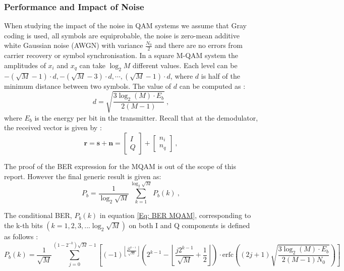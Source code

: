 \documentclass[12pt,a4paper,openright]{report}
\begin{document}
\subsubsection{Performance and Impact of Noise}
\label{sec:MQAMperf}
When studying the impact of the noise in QAM systems we assume that Gray coding is used, all symbols are equiprobable, the noise is zero-mean additive white Gaussian noise (AWGN) with variance $\frac{N_0}{2}$ and there are no errors from carrier recovery or symbol synchronisation. In a square M-QAM system the amplitudes of $x_i$ and $x_q$ can take $\log_2{M}$ different values. Each level can be 
$ -(\sqrt M  -1)\cdot d, - (\sqrt M  - 3)\cdot d,\cdots,(\sqrt M  - 1)\cdot d $, where $d$ is half of the minimum distance between two symbols. The value of $d$ can be computed as \cite{BER-QAM paper}: 
\begin{equation}\label{Eq: MQAM min dist}
d = \sqrt {\frac{{3{{\log }_2}(M) \cdot {E_b}}}{{2(M - 1)}}}\ ,
\end{equation}
where $E_b$ is the energy per bit in the transmitter. Recall that at the demodulator, the received vector is given by \cite{BER-QAM paper}: 
\begin{equation}
 \mathbf{r}=\mathbf{s}+\mathbf{n}=\left[ \begin{array}{l}I\\Q \end{array} \right] + \left[ \begin{array}{l}{n_i}\\{n_q}\end{array} \right]\ ,
\end{equation}


The proof of the BER expression for the MQAM is out of the scope of this report. However the final generic result is given as: 
\begin{equation}\label{Eq: BER MQAM}
{P_b} = \frac{1}{{{{\log }_2}\sqrt M }}\sum\limits_{k = 1}^{{{\log }_2}\sqrt M } {{P_b}(k)}\ ,
\end{equation}


The conditional BER,  $P_b(k)$ in equation \ref{Eq: BER MQAM}, corresponding to the k-th bits $(k=1,2,3,... \log_2{\sqrt{M}} )$ on both I and Q components is defined as follows \cite{BER-QAM paper}:
\begin{equation} \label{eq:mqamBER}
{P_b}(k) = \frac{1}{{\sqrt M }}\sum\limits_{j = 0}^{(1 - {2^{ - k}})\sqrt M  - 1} {\left[ {{{( - 1)}^{\left\lfloor {\frac{{j{2^{k - 1}}}}{{\sqrt M }}} \right\rfloor }}\left( {{2^{k - 1}} - \left\lfloor {\frac{{j{2^{k - 1}}}}{{\sqrt M }} + \frac{1}{2}} \right\rfloor } \right) \cdot \text{erfc}\left( {(2j + 1)\sqrt {\frac{{3{{\log }_2}(M) \cdot {E_b}}}{{2(M - 1){N_0}}}} } \right)} \right]}
\end{equation}
\end{document}
